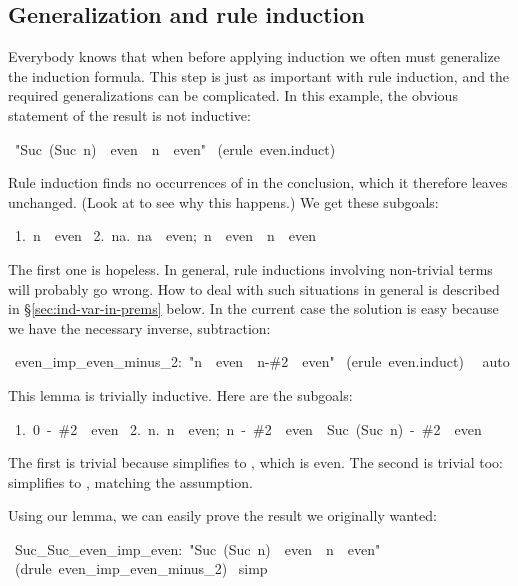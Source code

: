 \subsection{Generalization and rule induction}
\label{sec:gen-rule-induction}

Everybody knows that when before applying induction we often must generalize
the induction formula.  This step is just as important with rule induction,
and the required generalizations can be complicated.  In this 
example, the obvious statement of the result is not inductive:
%
\begin{isabelle}
\ "Suc\ (Suc\ n)\ \isasymin \ even\
\isasymLongrightarrow \ n\ \isasymin \ even"\isanewline
{}\ (erule\ even.induct)\isanewline
{}
\end{isabelle}
%
Rule induction finds no occurrences of  in the
conclusion, which it therefore leaves unchanged.  (Look at
 to see why this happens.)  We get these subgoals:
\begin{isabelle}
\ 1.\ n\ \isasymin \ even\isanewline
\ 2.\ \isasymAnd na.\ \isasymlbrakk na\ \isasymin \ even;\ n\ \isasymin \ even\isasymrbrakk \ \isasymLongrightarrow \ n\ \isasymin \ even%
\end{isabelle}
The first one is hopeless.  In general, rule inductions involving
non-trivial terms will probably go wrong. How to deal with such situations
in general is described in {\S}\ref{sec:ind-var-in-prems} below.
In the current case the solution is easy because
we have the necessary inverse, subtraction:
\begin{isabelle}
\ even_imp_even_minus_2:\ "n\ \isasymin \ even\ \isasymLongrightarrow \ n-\#2\ \isasymin \ even"\isanewline
{}\ (erule\ even.induct)\isanewline
\ \isacommand{apply}\ auto\isanewline
{}
\end{isabelle}
%
This lemma is trivially inductive.  Here are the subgoals:
\begin{isabelle}
\ 1.\ 0\ -\ \#2\ \isasymin \ even\isanewline
\ 2.\ \isasymAnd n.\ \isasymlbrakk n\ \isasymin \ even;\ n\ -\ \#2\ \isasymin \ even\isasymrbrakk \ \isasymLongrightarrow \ Suc\ (Suc\ n)\ -\ \#2\ \isasymin \ even%
\end{isabelle}
The first is trivial because  simplifies to , which is
even.  The second is trivial too: \isa{Suc\ (Suc\ n)\ -\ \#2} simplifies to
\isa{n}, matching the assumption.

\medskip
Using our lemma, we can easily prove the result we originally wanted:
\begin{isabelle}
\ Suc_Suc_even_imp_even:\ "Suc\ (Suc\ n)\ \isasymin \ even\ \isasymLongrightarrow \ n\ \isasymin \ even"\isanewline
{}\ (drule\ even_imp_even_minus_2)\isanewline
\isacommand{apply}\ simp\isanewline
{}
\end{isabelle}

